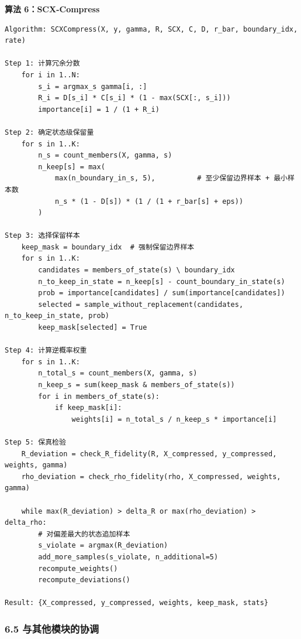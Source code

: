\documentclass[
  12pt,
]{ctexart}
\begin{document}
\textbf{算法 6：SCX-Compress}

\begin{verbatim}
Algorithm: SCXCompress(X, y, gamma, R, SCX, C, D, r_bar, boundary_idx, rate)

Step 1: 计算冗余分数
    for i in 1..N:
        s_i = argmax_s gamma[i, :]
        R_i = D[s_i] * C[s_i] * (1 - max(SCX[:, s_i]))
        importance[i] = 1 / (1 + R_i)

Step 2: 确定状态级保留量
    for s in 1..K:
        n_s = count_members(X, gamma, s)
        n_keep[s] = max(
            max(n_boundary_in_s, 5),          # 至少保留边界样本 + 最小样本数
            n_s * (1 - D[s]) * (1 / (1 + r_bar[s] + eps))
        )

Step 3: 选择保留样本
    keep_mask = boundary_idx  # 强制保留边界样本
    for s in 1..K:
        candidates = members_of_state(s) \ boundary_idx
        n_to_keep_in_state = n_keep[s] - count_boundary_in_state(s)
        prob = importance[candidates] / sum(importance[candidates])
        selected = sample_without_replacement(candidates, n_to_keep_in_state, prob)
        keep_mask[selected] = True

Step 4: 计算逆概率权重
    for s in 1..K:
        n_total_s = count_members(X, gamma, s)
        n_keep_s = sum(keep_mask & members_of_state(s))
        for i in members_of_state(s):
            if keep_mask[i]:
                weights[i] = n_total_s / n_keep_s * importance[i]

Step 5: 保真检验
    R_deviation = check_R_fidelity(R, X_compressed, y_compressed, weights, gamma)
    rho_deviation = check_rho_fidelity(rho, X_compressed, weights, gamma)

    while max(R_deviation) > delta_R or max(rho_deviation) > delta_rho:
        # 对偏差最大的状态追加样本
        s_violate = argmax(R_deviation)
        add_more_samples(s_violate, n_additional=5)
        recompute_weights()
        recompute_deviations()

Result: {X_compressed, y_compressed, weights, keep_mask, stats}
\end{verbatim}

\subsubsection{6.5
与其他模块的协调}\label{ux4e0eux5176ux4ed6ux6a21ux5757ux7684ux534fux8c03-5}
\end{document}
